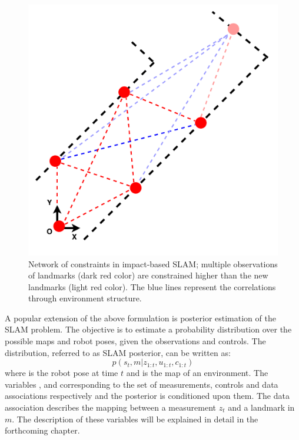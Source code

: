 \begin{figure}
\centering
\includegraphics[scale=0.4]{./images/network_constraint}
\caption[Network of constraints in impact-based SLAM]{Network of constraints in impact-based SLAM; multiple observations of landmarks (dark red color) are constrained higher than the new landmarks (light red color). The blue lines represent the correlations through environment structure.}
\label{network_constraint}
\end{figure}  

A popular extension of the above formulation is posterior estimation of the SLAM problem. The objective is to estimate a probability distribution over the possible maps and robot poses, given the observations and controls. The distribution, referred to as SLAM posterior, can be written as:
\begin{equation}
p(s_t,m|z_{1:t},u_{1:t},c_{1:t})
\end{equation}
where  is the robot pose at time $t$ and  is the map of an environment. The variables ,  and  corresponding to the set of measurements, controls and data associations respectively and the posterior is conditioned upon them. The data association describes the mapping between a measurement $z_t$ and a landmark in $m$. The description of these variables will be explained in detail in the forthcoming chapter.

